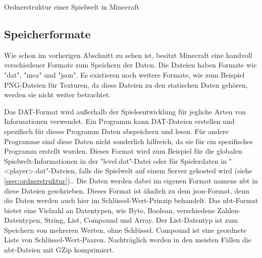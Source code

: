 \begin{listing}[htp]
    \caption{Ordnerstruktur einer Spielwelt in Minecraft\cite{minecraftFolderStruc}}
    \label{lst:ordnerStrukturMinecraft}
\end{listing}



\subsection{Speicherformate}
Wie schon im vorherigen Abschnitt zu sehen ist, besitzt Minecraft eine handvoll verschiedener Formate zum Speichern der Daten. Die Dateien haben Formate wie "dat", "mca" und "json". Es existieren noch weitere Formate, wie zum Beispiel PNG-Dateien für Texturen, da diese Dateien zu den statischen Daten gehören, werden sie nicht weiter betrachtet.   

Das DAT-Format wird außerhalb der Spieleentwicklung für jegliche Arten von Informationen verwendet. Ein Programm kann DAT-Dateien erstellen und spezifisch für dieses Programm Daten abspeichern und lesen. Für andere Programme sind diese Daten nicht sonderlich hilfreich, da sie für ein spezifisches Programm erstellt wurden.\cite{adobeWhatDAT} Dieses Format wird zum Beispiel für die globalen Spielwelt-Informationen in der "level.dat"-Datei oder für Spielerdaten in "<player>.dat"-Dateien, falls die Spielwelt auf einem Server gehosted wird (siehe \ref{ssec:ordnerstruktur}).\cite{minecraftPlayerdatFormat}\cite{minecraftFolderStruc}. 
Die Daten werden dabei im eigenen Format namens \ac{nbt} in diese Dateien geschrieben. Dieses Format ist ähnlich zu dem \ac{json}-Format, denn die Daten werden auch hier im Schlüssel-Wert-Prinzip behandelt. Das \ac{nbt}-Format bietet eine Vielzahl an Datentypen, wie Byte, Boolean, verschiedene Zahlen-Datentypen, String, List, Compound und Array. Der List-Datentyp ist zum Speichern von mehreren Werten, ohne Schlüssel. Compound ist eine geordnete Liste von Schlüssel-Wert-Paaren. Nachträglich werden in den meisten Fällen die \ac{nbt}-Dateien mit GZip komprimiert.
\cite{minecraftNBT}

